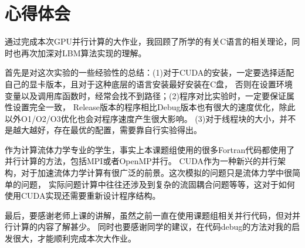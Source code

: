 \documentclass[UTF8]{ctexart}
\begin{document}
        \section{心得体会}
        通过完成本次GPU并行计算的大作业，我回顾了所学的有关C语言的相关理论，同时也再次加深对LBM算法实现的理解。

        首先是对这次实验的一些经验性的总结：(1)对于CUDA的安装，一定要选择适配自己的显卡版本，且对于这种底层的语言安装最好安装在C盘，
        否则在设置环境变量以及调用库函数时，经常会找不到路径；(2)程序对比实验时，一定要保证属性设置完全一致， 
        Release版本的程序相比Debug版本也有很大的速度优化，除此以外O1/O2/O3优化也会对程序速度产生很大影响。
        (3)对于线程块的大小，并不是越大越好，存在最优的配置，需要靠自行实验得出。

        作为计算流体力学专业的学生，事实上本课题组使用的很多Fortran代码都使用了并行计算的方法，包括MPI或者OpenMP并行。
        CUDA作为一种新兴的并行架构，对于加速流体力学计算有很广泛的前景。这次模拟的问题只是流体力学中很简单的问题，
        实际问题计算中往往还涉及到复杂的流固耦合问题等等，这对于如何使用CUDA实现还需要重新设计程序结构。

        最后，要感谢老师上课的讲解，虽然之前一直在使用课题组相关并行代码，但对并行计算的内容了解甚少。
        同时也要感谢同学的建议，在代码debug的方法对我的启发很大，才能顺利完成本次大作业。
\end{document}
